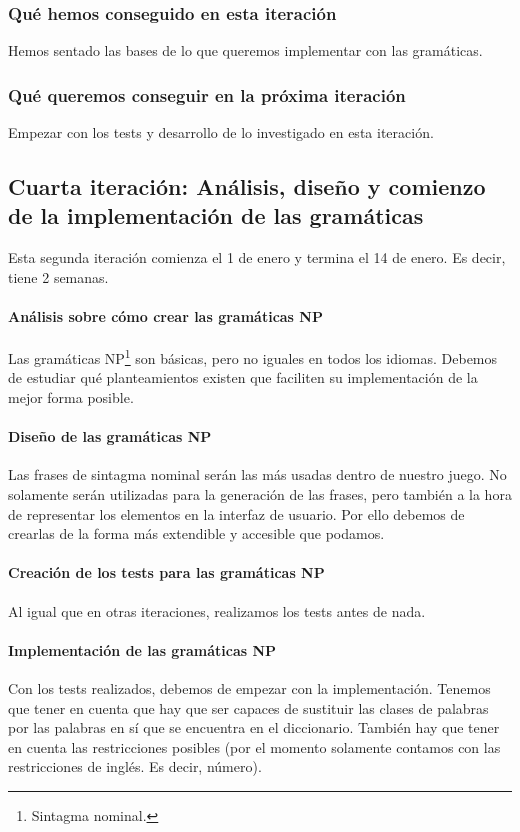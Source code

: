 \subsubsection{Qué hemos conseguido en esta iteración}

Hemos sentado las bases de lo que queremos implementar con las gramáticas.

\subsubsection{Qué queremos conseguir en la próxima iteración}

Empezar con los tests y desarrollo de lo investigado en esta iteración.

\subsection{Cuarta iteración: Análisis, diseño y comienzo de la implementación de las gramáticas}

Esta segunda iteración comienza el 1 de enero y termina el 14 de enero. Es decir, tiene 2 semanas.

\paragraph{Análisis sobre cómo crear las gramáticas NP} Las gramáticas NP\footnote{Sintagma nominal.} son básicas, pero no iguales en todos los idiomas. Debemos de estudiar qué planteamientos existen que faciliten su implementación de la mejor forma posible.

\paragraph{Diseño de las gramáticas NP} Las frases de sintagma nominal serán las más usadas dentro de nuestro juego. No solamente serán utilizadas para la generación de las frases, pero también a la hora de representar los elementos en la interfaz de usuario. Por ello debemos de crearlas de la forma más extendible y accesible que podamos.

\paragraph{Creación de los tests para las gramáticas NP} Al igual que en otras iteraciones, realizamos los tests antes de nada.

\paragraph{Implementación de las gramáticas NP} Con los tests realizados, debemos de empezar con la implementación. Tenemos que tener en cuenta que hay que ser capaces de sustituir las clases de palabras por las palabras en sí que se encuentra en el diccionario. También hay que tener en cuenta las restricciones posibles (por el momento solamente contamos con las restricciones de inglés. Es decir, número).

